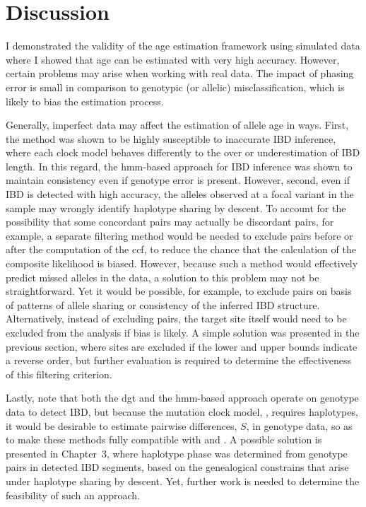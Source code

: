%
\section{Discussion}
%




I demonstrated the validity of the age estimation framework using simulated data where I showed that age can be estimated with very high accuracy.
However, certain problems may arise when working with real data.
The impact of phasing error is small in comparison to genotypic (or allelic) misclassification, which is likely to bias the estimation process.

Generally, imperfect data may affect the estimation of allele age in  ways.
First, the method was shown to be highly susceptible to inaccurate IBD inference, where each clock model behaves differently to the over or underestimation of IBD length.
In this regard, the \gls{hmm}-based approach for IBD inference was shown to maintain consistency even if genotype error is present.
However, second, even if IBD is detected with high accuracy, the alleles observed at a focal variant in the sample may wrongly identify haplotype sharing by descent.
To account for the possibility that some concordant pairs may actually be discordant pairs, for example, a separate filtering method would be needed to exclude pairs before or after the computation of the \gls{ccf}, to reduce the chance that the calculation of the composite likelihood is biased.
However, because such a method would effectively predict missed alleles in the data, a solution to this problem may not be straightforward.
Yet it would be possible, for example, to exclude pairs on basis of patterns of allele sharing or consistency of the inferred IBD structure.
Alternatively, instead of excluding pairs, the target site itself would need to be excluded from the analysis if bias is likely.
A simple solution was presented in the previous section, where sites are excluded if the lower and upper bounds indicate a reverse order, but further evaluation is required to determine the effectiveness of this filtering criterion.

Lastly, note that both the \gls{dgt} and the \gls{hmm}-based approach operate on genotype data to detect IBD, but because the mutation clock model, \ClockM, requires haplotypes, it would be desirable to estimate pairwise differences, $S$, in genotype data, so as to make these methods fully compatible with \ClockM and \ClockC.
A possible solution is presented in Chapter~3, where haplotype phase was determined from genotype pairs in detected IBD segments, based on the genealogical constrains that arise under haplotype sharing by descent.
Yet, further work is needed to determine the feasibility of such an approach.




